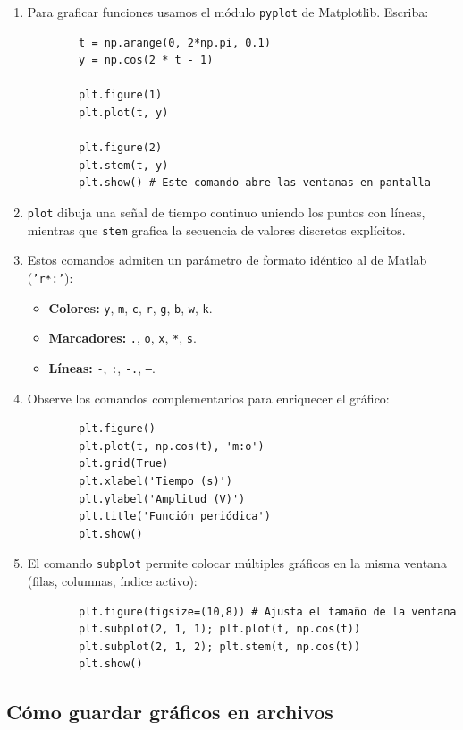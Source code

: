 \begin{enumerate}
	\item Para graficar funciones usamos el módulo \texttt{pyplot} de Matplotlib. Escriba:
	\begin{verbatim}
		t = np.arange(0, 2*np.pi, 0.1)
		y = np.cos(2 * t - 1)
		
		plt.figure(1)
		plt.plot(t, y)
		
		plt.figure(2)
		plt.stem(t, y)
		plt.show() # Este comando abre las ventanas en pantalla
	\end{verbatim}
	
	\item \texttt{plot} dibuja una señal de tiempo continuo uniendo los puntos con líneas, mientras que \texttt{stem} grafica la secuencia de valores discretos explícitos.
	
	\item Estos comandos admiten un parámetro de formato idéntico al de Matlab (\texttt{'r*:'}):
	\begin{itemize}
		\item \textbf{Colores:} \texttt{y}, \texttt{m}, \texttt{c}, \texttt{r}, \texttt{g}, \texttt{b}, \texttt{w}, \texttt{k}.
		\item \textbf{Marcadores:} \texttt{.}, \texttt{o}, \texttt{x}, \texttt{*}, \texttt{s}.
		\item \textbf{Líneas:} \texttt{-}, \texttt{:}, \texttt{-.}, \texttt{--}.
	\end{itemize}
	
	\item Observe los comandos complementarios para enriquecer el gráfico:
	\begin{verbatim}
		plt.figure()
		plt.plot(t, np.cos(t), 'm:o')
		plt.grid(True)
		plt.xlabel('Tiempo (s)')
		plt.ylabel('Amplitud (V)')
		plt.title('Función periódica')
		plt.show()
	\end{verbatim}
	
	\item El comando \texttt{subplot} permite colocar múltiples gráficos en la misma ventana (filas, columnas, índice activo):
	\begin{verbatim}
		plt.figure(figsize=(10,8)) # Ajusta el tamaño de la ventana
		plt.subplot(2, 1, 1); plt.plot(t, np.cos(t))
		plt.subplot(2, 1, 2); plt.stem(t, np.cos(t))
		plt.show()
	\end{verbatim}
\end{enumerate}

\subsection{Cómo guardar gráficos en archivos}

